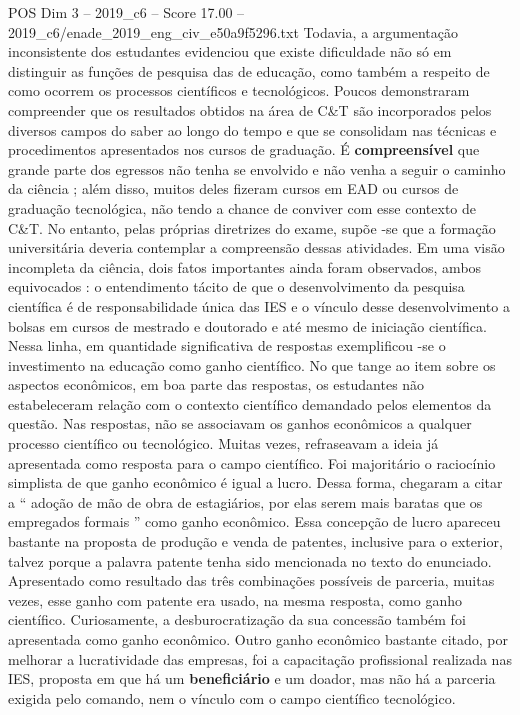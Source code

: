 \begin{textsample}{POS Dim 3 – 2019\_c6 – Score 17.00 – 2019\_c6/enade\_2019\_eng\_civ\_e50a9f5296.txt}
Todavia, a argumentação inconsistente dos estudantes evidenciou que existe dificuldade não só em distinguir as funções de pesquisa das de educação, como também a respeito de como ocorrem os processos científicos e tecnológicos.
Poucos demonstraram compreender que os resultados obtidos na área de C\&T são incorporados pelos diversos campos do saber ao longo do tempo e que se consolidam nas técnicas e procedimentos apresentados nos cursos de graduação.
É \textbf{compreensível} que grande parte dos egressos não tenha se envolvido e não venha a seguir o caminho da ciência ; além disso, muitos deles fizeram cursos em EAD ou cursos de graduação tecnológica, não tendo a chance de conviver com esse contexto de C\&T.
No entanto, pelas próprias diretrizes do exame, supõe -se que a formação universitária deveria contemplar a compreensão dessas atividades.
Em uma visão incompleta da ciência, dois fatos importantes ainda foram observados, ambos equivocados : o entendimento tácito de que o desenvolvimento da pesquisa científica é de responsabilidade única das IES e o vínculo desse desenvolvimento a bolsas em cursos de mestrado e doutorado e até mesmo de iniciação científica.
Nessa linha, em quantidade significativa de respostas exemplificou -se o investimento na educação como ganho científico.
No que tange ao item sobre os aspectos econômicos, em boa parte das respostas, os estudantes não estabeleceram relação com o contexto científico demandado pelos elementos da questão.
Nas respostas, não se associavam os ganhos econômicos a qualquer processo científico ou tecnológico.
Muitas vezes, refraseavam a ideia já apresentada como resposta para o campo científico.
Foi majoritário o raciocínio simplista de que ganho econômico é igual a lucro.
Dessa forma, chegaram a citar a “ adoção de mão de obra de estagiários, por elas serem mais baratas que os empregados formais ” como ganho econômico.
Essa concepção de lucro apareceu bastante na proposta de produção e venda de patentes, inclusive para o exterior, talvez porque a palavra patente tenha sido mencionada no texto do enunciado.
Apresentado como resultado das três combinações possíveis de parceria, muitas vezes, esse ganho com patente era usado, na mesma resposta, como ganho científico.
Curiosamente, a desburocratização da sua concessão também foi apresentada como ganho econômico.
Outro ganho econômico bastante citado, por melhorar a lucratividade das empresas, foi a capacitação profissional realizada nas IES, proposta em que há um \textbf{beneficiário} e um doador, mas não há a parceria exigida pelo comando, nem o vínculo com o campo científico tecnológico.

\end{textsample}
